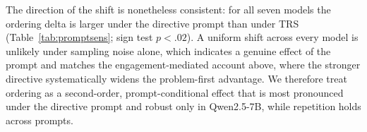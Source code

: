 The direction of the shift is nonetheless consistent: for all seven models the
ordering delta is larger under the directive prompt than under TRS
(Table~\ref{tab:promptsens}; sign test $p<.02$). A uniform shift across every
model is unlikely under sampling noise alone, which indicates a genuine effect
of the prompt and matches the engagement-mediated account above, where the
stronger directive systematically widens the problem-first advantage. We
therefore treat ordering as a second-order, prompt-conditional effect that is
most pronounced under the directive prompt and robust only in Qwen2.5-7B, while
repetition holds across prompts.


